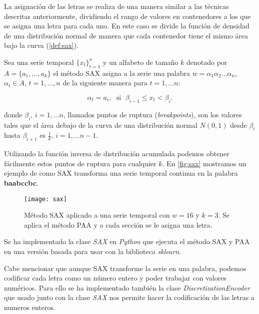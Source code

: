 La asignación de las letras se realiza de una manera similar a las técnicas descritas anteriormente, dividiendo el rango de valores en contenedores a los que se asigna una letra para cada uno. En este caso se divide la función de densidad de una distribución normal de manera que cada contenedor tiene el mismo área bajo la curva (\autoref{def:sax}).

\begin{definicion}[SAX]
  Sea una serie temporal $\{x_t\}_{t = 1}^n$ y un alfabeto de tamaño $k$ denotado por $A = \{a_1, \ldots, a_k\}$ el método SAX asigna a la serie una palabra $w = \alpha_1\alpha_2\ldots\alpha_n$, $\alpha_t \in A, \, t = 1, \ldots, n$ de la siguiente manera para $t = 1, \ldots n$:

  $$\alpha_t = a_i, \; \text{ si } \; \beta_{i-1} \leq x_t < \beta_i.$$

  donde $\beta_i$, $i = 1, \ldots n$, llamados puntos de ruptura (\emph{breakpoints}), son los valores tales que el área debajo de la curva de una distribución normal $N(0,1)$ desde $\beta_i$ hasta $\beta_{i+1}$ es $\frac{1}{k}$, $i = 1, \ldots n-1$.
  \label{def:sax}
\end{definicion}

Utilizando la función inversa de distribución acumulada podemos obtener fácilmente estos puntos de ruptura para cualquier $k$. En \autoref{fig:sax} \cite{lin2007experiencing} mostramos un ejemplo de como SAX transforma una serie temporal continua en la palabra \textbf{baabccbc}.

\begin{figure}[htpb]
  \centering
  \texttt{[image: sax]}
  \caption{Método SAX aplicado a una serie temporal con $w = 16$ y $k = 3$. Se aplica el método PAA y a cada sección se le asigna una letra.}
  \label{fig:sax}
\end{figure}

Se ha implementado la clase \emph{SAX} en \emph{Python} que ejecuta el método SAX y PAA en una versión basada para usar con la biblioteca \emph{sklearn}.

Cabe mencionar que aunque SAX transforme la serie en una palabra, podemos codificar cada letra como un número entero y poder trabajar con valores numéricos. Para ello se ha implementado también la clase \emph{DiscretizationEncoder} que usado junto con la clase \emph{SAX} nos permite hacer la codificación de las letras a numeros enteros.
